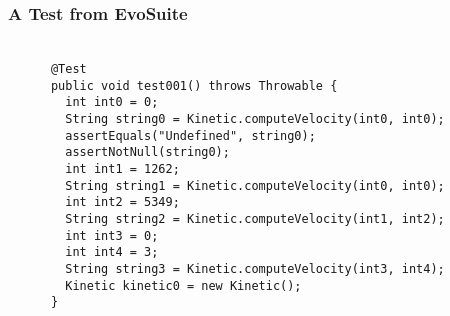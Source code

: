 
\begin{frame}[fragile]
  \frametitle{\vspace*{.5in}A Test from EvoSuite}
  \framesubtitle{}

  \normalsize
  \hspace*{-.75in}
  \begin{minipage}{5in}
    \large
    \vspace*{-.25in}
    \begin{verbatim}

      @Test
      public void test001() throws Throwable {
        int int0 = 0;
        String string0 = Kinetic.computeVelocity(int0, int0);
        assertEquals("Undefined", string0);
        assertNotNull(string0);
        int int1 = 1262;
        String string1 = Kinetic.computeVelocity(int0, int0);
        int int2 = 5349;
        String string2 = Kinetic.computeVelocity(int1, int2);
        int int3 = 0;
        int int4 = 3;
        String string3 = Kinetic.computeVelocity(int3, int4);
        Kinetic kinetic0 = new Kinetic();
      }

    \end{verbatim}
  \end{minipage}
  \normalsize

\end{frame}
